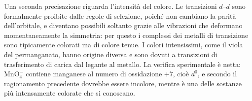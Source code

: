 Una seconda precisazione riguarda l'intensità del colore.
Le transizioni $d$--$d$ sono formalmente proibite dalle regole di selezione, poiché non cambiano la parità dell'orbitale, e diventano possibili soltanto grazie alle vibrazioni che deformano momentaneamente la simmetria: per questo i complessi dei metalli di transizione sono tipicamente colorati ma di colore tenue.
I colori intensissimi, come il viola del permanganato, hanno origine diversa e sono dovuti a transizioni di trasferimento di carica dal legante al metallo.
La verifica sperimentale è netta: $\mathrm{MnO_4^-}$ contiene manganese al numero di ossidazione $+7$, cioè $d^0$, e secondo il ragionamento precedente dovrebbe essere incolore, mentre è una delle sostanze più intensamente colorate che si conoscano.
